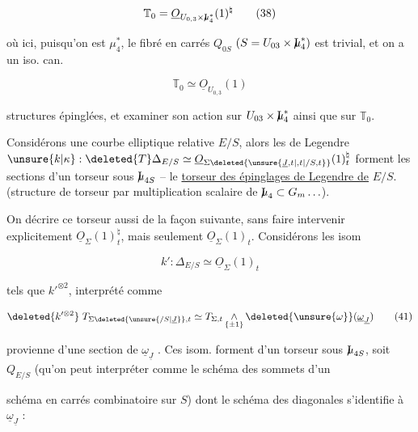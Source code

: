 \[
\mathbb{T}_0=\underline O_{U_{0,3}\times \mathord{\mathrm{I}\mkern-7mu\mu}_4^*}(1)^{\natural}
\tag*{(38)}
\]

où ici, puisqu'on est   $\mu_4^*$, le fibré en carrés $Q_{0S}$ $(S=U_{03}\times \mathord{\mathrm{I}\mkern-7mu\mu}_4^*)$ est trivial, et on a un iso. can.

\[
\mathbb{T}_0\simeq\underline O_{U_{0,3}}(1)
\tag*{(39)}
\]

  structures épinglées, et examiner son action sur $U_{03}\times \mathord{\mathrm{I}\mkern-7mu\mu}_4^*$ ainsi que sur $\mathbb{T}_0$.

Considérons une courbe elliptique relative $E/S$, alors les   de Legendre $\unsure{k|\kappa}:\deleted{T}\Delta_{E/S}\simeq\underline O_{\Sigma\deleted{\unsure{\underline J,t|,t|/S,t}}}(1)_t^{\natural}$ forment les sections d'un torseur sous $\mathord{\mathrm{I}\mkern-7mu\mu}_{4S}$ -- le \uline{torseur  des épinglages de Legendre de} $E/S$. (structure de torseur par multiplication scalaire de $\mathord{\mathrm{I}\mkern-7mu\mu}_4\subset G_m\ldots$).

On   décrire ce torseur aussi de la façon suivante, sans faire intervenir explicitement $\underline O_{\Sigma}(1)_t^\natural$, mais seulement $\underline O_{\Sigma}(1)_t$. Considérons les isom

\[
k':\Delta_{E/S}\simeq\underline O_{\Sigma}(1)_t
\tag*{(40)}
\]

tels que $k'^{\otimes2}$, interprété comme

\[
\deleted{k'^{\otimes2}}\;T_{\Sigma\deleted{\unsure{/S|\underline J}},t}\simeq T_{\Sigma,t}\mathop{\wedge}_{\{\pm1\}}\deleted{\unsure{\omega}}(\underline\omega_{\underline J})
\tag*{(41)}
\]

provienne d'une section de $\underline\omega_{\underline J}$ . Ces isom. forment   d'un torseur sous $\mathord{\mathrm{I}\mkern-7mu\mu}_{4S}$, soit $Q_{E/S}$ (qu'on peut interpréter comme le schéma des sommets d'un


schéma en carrés combinatoire sur $S$) dont le schéma des diagonales s'identifie à $\underline\omega_{\underline J}$ :

